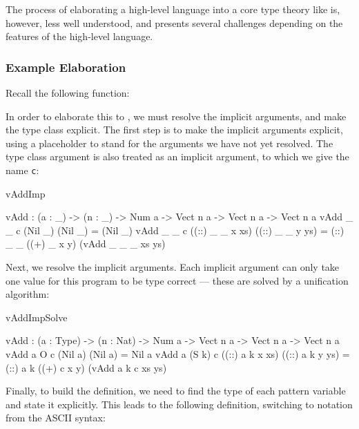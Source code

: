 The process of elaborating a high-level language into a core type theory like \TT{} is,
however, less well understood, and presents several challenges depending on the
features of the high-level language. 

\subsubsection{Example Elaboration}

Recall the following \Idris{} function:


\noindent
In order to elaborate
this to \TT{}, we must resolve the implicit arguments, and make the type class explicit.
The first step is to make the implicit arguments explicit, using a placeholder
to stand for the arguments we have not yet resolved. The type class argument is
also treated as an implicit argument, to which we give the name \texttt{c}:

\begin{SaveVerbatim}{vAddImp}

vAdd : (a : _) -> (n : _) -> 
       Num a -> Vect n a -> Vect n a -> Vect n a
vAdd _ _ c (Nil _)         (Nil _)         = (Nil _)
vAdd _ _ c ((::) _ _ x xs) ((::) _ _ y ys) 
                = (::) _ _ ((+) _ x y) (vAdd _ _ _ xs ys)

\end{SaveVerbatim}

Next, we resolve the implicit arguments. Each implicit argument can only take
one value for this program to be type correct --- these are solved by a unification
algorithm:

\begin{SaveVerbatim}{vAddImpSolve}

vAdd : (a : Type) -> (n : Nat) -> 
       Num a -> Vect n a -> Vect n a -> Vect n a
vAdd a O     c (Nil a)         (Nil a)         = Nil a
vAdd a (S k) c ((::) a k x xs) ((::) a k y ys) 
                = (::) a k ((+) c x y) (vAdd a k c xs ys)

\end{SaveVerbatim}

Finally, to build the \TT{} definition, we need to find the type of each
pattern variable and state it explicitly. This leads to the following
\TT{} definition, switching to \TT{} notation from the ASCII \Idris{}
syntax:

